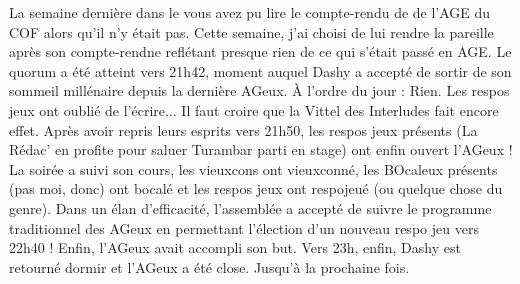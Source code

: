 La semaine dernière dans le \BOcal{} vous avez pu lire le compte-rendu de \DarkSySy{} de l'AGE du COF alors qu'il n'y était pas. Cette semaine, j'ai choisi de lui rendre la pareille après son compte-rendne reflétant presque rien de ce qui s'était passé en AGE. 
Le quorum a été atteint vers 21h42, moment auquel Dashy a accepté de sortir de son sommeil millénaire depuis la dernière AGeux. 
À l'ordre du jour : Rien. Les respos jeux ont oublié de l'écrire... 
Il faut croire que la Vittel des Interludes fait encore effet. 
Après avoir repris leurs esprits vers 21h50, les respos jeux présents (La Rédac' en profite pour saluer Turambar parti en stage) ont enfin ouvert l'AGeux !
La soirée a suivi son cours, les vieuxcons ont vieuxconné, les BOcaleux présents (pas moi, donc) ont bocalé et les respos jeux ont respojeué (ou quelque chose du genre).
Dans un élan d'efficacité, l'assemblée a accepté de suivre le programme traditionnel des AGeux en permettant l'élection d'un nouveau respo jeu vers 22h40 !
Enfin, l'AGeux avait accompli son but. Vers 23h, enfin, Dashy est retourné dormir et l'AGeux a été close. Jusqu'à la prochaine fois. 
\signature{Pandada, pour embêter \DarkSySy{}} 

